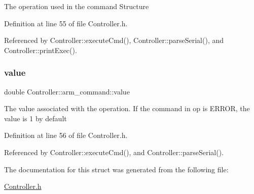 The operation used in the command Structure 

Definition at line 55 of file Controller.\+h.



Referenced by Controller\+::execute\+Cmd(), Controller\+::parse\+Serial(), and Controller\+::print\+Exec().

\mbox{\label{struct_controller_1_1arm__command_a2e40c7e8947f625f1d39ac9568a1976a}} 
\subsubsection{\texorpdfstring{value}{value}}
{\footnotesize\ttfamily double Controller\+::arm\+\_\+command\+::value}

The value associated with the operation. If the command in op is E\+R\+R\+OR, the value is 1 by default 

Definition at line 56 of file Controller.\+h.



Referenced by Controller\+::execute\+Cmd(), and Controller\+::parse\+Serial().



The documentation for this struct was generated from the following file\+:\begin{DoxyCompactItemize}
\item 
\hyperlink{_controller_8h}{Controller.\+h}\end{DoxyCompactItemize}
